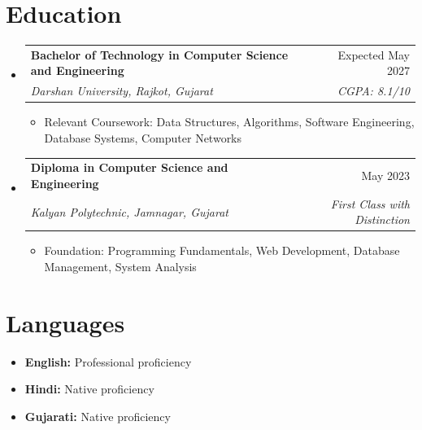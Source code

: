 \documentclass[11pt,a4paper]{article}
\makeatletter
\newcommand{\resumeSubheading}[4]{
  \vspace{-1pt}\item
    \begin{tabular*}{0.97\textwidth}[t]{l@{\extracolsep{\fill}}r}
      \textbf{#1} & #2 \\
      \textit{#3} & \textit{#4} \\
    \end{tabular*}\vspace{-3pt}
}
\newcommand{\resumeItem}[1]{
  \item\small{#1 \vspace{-1pt}}
}
\makeatother
\begin{document}
\section{Education}
\begin{itemize}[leftmargin=*]
\resumeSubheading
{Bachelor of Technology in Computer Science and Engineering}{Expected May 2027}
{Darshan University, Rajkot, Gujarat}{CGPA: 8.1/10}
\begin{itemize}[leftmargin=*]
\resumeItem{Relevant Coursework: Data Structures, Algorithms, Software Engineering, Database Systems, Computer Networks}
\end{itemize}

\resumeSubheading
{Diploma in Computer Science and Engineering}{May 2023}
{Kalyan Polytechnic, Jamnagar, Gujarat}{First Class with Distinction}
\begin{itemize}[leftmargin=*]
\resumeItem{Foundation: Programming Fundamentals, Web Development, Database Management, System Analysis}
\end{itemize}
\end{itemize}

\section{Languages}
\begin{itemize}[leftmargin=*]
\resumeItem{\textbf{English:} Professional proficiency}
\resumeItem{\textbf{Hindi:} Native proficiency}
\resumeItem{\textbf{Gujarati:} Native proficiency}
\end{itemize}

\end{document}
